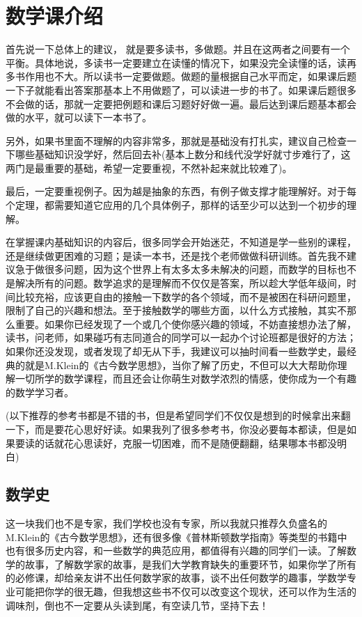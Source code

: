 \section{数学课介绍}
首先说一下总体上的建议， 就是要多读书，多做题。并且在这两者之间要有一个平衡。具体地说，多读书一定要建立在读懂的情况下，如果没完全读懂的话，读再多书作用也不大。所以读书一定要做题。做题的量根据自己水平而定，如果课后题一下子就能看出答案那基本上不用做题了，可以读进一步的书了。如果课后题很多不会做的话，那就一定要把例题和课后习题好好做一遍。最后达到课后题基本都会做的水平，就可以读下一本书了。\par
另外，如果书里面不理解的内容非常多，那就是基础没有打扎实，建议自己检查一下哪些基础知识没学好，然后回去补(基本上数分和线代没学好就寸步难行了，这两门是最重要的基础，希望一定要重视，不然补起来就比较难了)。\par
最后，一定要重视例子。因为越是抽象的东西，有例子做支撑才能理解好。对于每个定理，都需要知道它应用的几个具体例子，那样的话至少可以达到一个初步的理解。\par
在掌握课内基础知识的内容后，很多同学会开始迷茫，不知道是学一些别的课程，还是继续做更困难的习题；是读一本书，还是找个老师做做科研训练。首先我不建议急于做很多问题，因为这个世界上有太多太多未解决的问题，而数学的目标也不是解决所有的问题。数学追求的是理解而不仅仅是答案，所以趁大学低年级间，时间比较充裕，应该更自由的接触一下数学的各个领域，而不是被困在科研问题里，限制了自己的兴趣和想法。至于接触数学的哪些方面，以什么方式接触，其实不那么重要。如果你已经发现了一个或几个使你感兴趣的领域，不妨直接想办法了解，读书，问老师，如果碰巧有志同道合的同学可以一起办个讨论班都是很好的方法；如果你还没发现，或者发现了却无从下手，我建议可以抽时间看一些数学史，最经典的就是M.Klein的《古今数学思想》，当你了解了历史，不但可以大大帮助你理解一切所学的数学课程，而且还会让你萌生对数学浓烈的情感，使你成为一个有趣的数学学习者。\par
(以下推荐的参考书都是不错的书，但是希望同学们不仅仅是想到的时候拿出来翻一下，而是要花心思好好读。如果我列了很多参考书，你没必要每本都读，但是如果要读的话就花心思读好，克服一切困难，而不是随便翻翻，结果哪本书都没明白)
\subsection{数学史}
这一块我们也不是专家，我们学校也没有专家，所以我就只推荐久负盛名的M.Klein的《古今数学思想》，还有很多像《普林斯顿数学指南》等类型的书籍中也有很多历史内容，和一些数学的典范应用，都值得有兴趣的同学们一读。了解数学的故事，了解数学家的故事，是我们大学教育缺失的重要环节，如果你学了所有的必修课，却给亲友讲不出任何数学家的故事，谈不出任何数学的趣事，学数学专业可能把你学的很无趣，但我想这些书不仅可以改变这个现状，还可以作为生活的调味剂，倒也不一定要从头读到尾，有空读几节，坚持下去！
